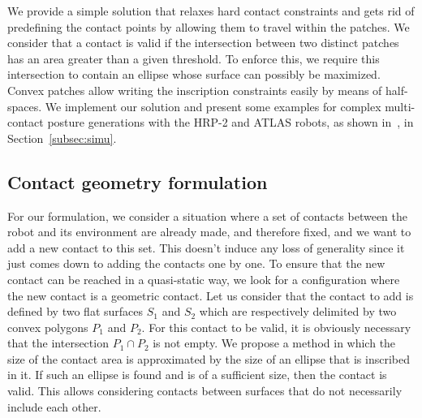 We provide a simple solution that relaxes hard contact constraints and gets rid of predefining the contact points by allowing them to travel within the patches.
We consider that a contact is valid if the intersection between two distinct patches has an area greater than a given threshold.
To enforce this, we require this intersection to contain an ellipse whose surface can possibly be maximized.
Convex patches allow writing the inscription constraints easily by means of half-spaces.
We implement our solution and present some examples for complex multi-contact posture generations with the HRP-2 and ATLAS robots, as shown in~, in Section~\ref{subsec:simu}.



\subsection{Contact geometry formulation}
\label{subsec:contact_geometry_formulation}


For our formulation, we consider a situation where a set of contacts between the robot and its environment are already made, and therefore fixed, and we want to add a new contact to this set.
This doesn't induce any loss of generality since it just comes down to adding the contacts one by one.
To ensure that the new contact can be reached in a quasi-static way, we look for a configuration where the new contact is a geometric contact.
Let us consider that the contact to add is defined by two flat surfaces $S_1$ and $S_2$ which are respectively delimited by two convex polygons $P_1$ and $P_2$.
For this contact to be valid, it is obviously necessary that the intersection $P_1 \cap P_2$ is not empty.
We propose a method in which the size of the contact area is approximated by the size of an ellipse that is inscribed in it.
If such an ellipse is found and is of a sufficient size, then the contact is valid.
This allows considering contacts between surfaces that do not necessarily include each other.

